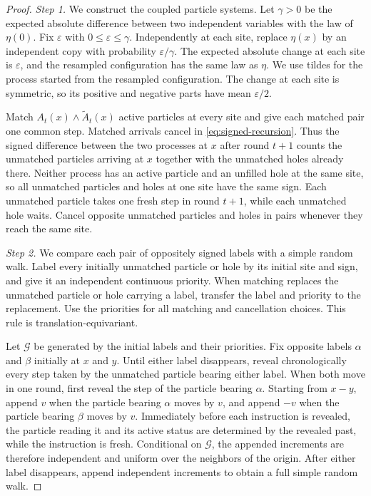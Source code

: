 \documentclass[11pt]{amsart}
\theoremstyle{plain}
\theoremstyle{definition}
\newcommand{\eps}{\varepsilon}
\begin{document}
\begin{proof}
	\smallskip
	\noindent\emph{Step 1.} We construct the coupled particle systems.
	Let $\gamma>0$ be the expected absolute difference between two independent
	variables with the law of $\eta(0)$.
	Fix $\eps$ with $0\leq\eps\leq\gamma$. Independently at each site, replace
	$\eta(x)$ by an independent copy with probability $\eps/\gamma$. The
	expected absolute change at each site is $\eps$, and the resampled
	configuration has the same law as $\eta$. We use tildes for the process
	started from the resampled configuration. The change at each site is
	symmetric, so its positive and negative parts have mean $\eps/2$.

	Match $A_t(x)\wedge\widetilde A_t(x)$ active particles at every site and give
	each matched pair one common step. Matched arrivals cancel in
	\eqref{eq:signed-recursion}. Thus the signed difference between the two
	processes at $x$ after round $t+1$ counts the unmatched particles arriving at
	$x$ together with the unmatched holes already there. Neither process has an
	active particle and an unfilled hole at the same site, so all unmatched
	particles and holes at one site have the same sign. Each unmatched particle
	takes one fresh step in round $t+1$, while each unmatched hole waits. Cancel
	opposite unmatched particles and holes in pairs whenever they reach the same
	site.

	\smallskip
	\noindent\emph{Step 2.} We compare each pair of oppositely signed labels with
	a simple random walk.
	Label every initially unmatched particle or hole by its initial site and
	sign, and give it an independent continuous priority. When matching replaces
	the unmatched particle or hole carrying a label, transfer the label and
	priority to the replacement. Use the priorities for all matching and
	cancellation choices. This rule is translation-equivariant.

	Let $\mathcal G$ be generated by the initial labels and their priorities. Fix
	opposite labels $\alpha$ and $\beta$ initially at $x$ and $y$. Until either
	label disappears, reveal chronologically every step taken by the unmatched
	particle bearing either label. When both move in one round, first reveal the
	step of the particle bearing $\alpha$. Starting from $x-y$, append $v$ when the particle
	bearing $\alpha$ moves by $v$, and append $-v$ when the particle bearing
	$\beta$ moves by $v$. Immediately before each instruction is revealed, the
	particle reading it and its active status are determined by the revealed past,
	while the instruction is fresh. Conditional on $\mathcal G$, the appended
	increments are therefore independent and uniform over the neighbors of the
	origin. After either label disappears, append independent increments to
	obtain a full simple random walk.


\end{proof}
\end{document}
